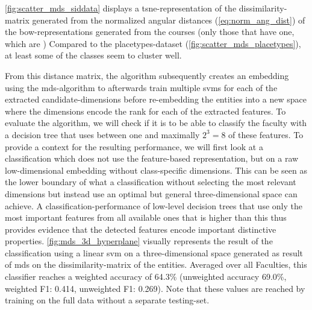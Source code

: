 \autoref{fig:scatter_mds_siddata} displays a \gls{tsne}-representation of the dissimilarity-matrix generated from the normalized angular distances (\autoref{eq:norm_ang_dist}) of the \gls{bow}-representations generated from the courses (only those that have one, which are ) Compared to the placetypes-dataset (\autoref{fig:scatter_mds_placetypes}), at least some of the classes seem to cluster well. 

From this distance matrix, the algorithm subsequently creates an embedding using the \gls{mds}-algorithm to afterwards train multiple \glspl{svm} for each of the extracted candidate-dimensions before re-embedding the entities into a new space where the dimensions encode the \gls{rank} for each of the extracted features. To evaluate the algorithm, we will check if it is to be able to classify the faculty with a decision tree that uses between one and maximally $2^3=8$ of these features. To provide a context for the resulting performance, we will first look at a classification which does not use the feature-based representation, but on a raw low-dimensional embedding without class-specific dimensions. This can be seen as the lower boundary of what a classification without selecting the most relevant dimensions but instead use an optimal but general three-dimensional space can achieve. A classification-performance of low-level decision trees that use only the most important features from all available ones that is higher than this thus provides evidence that the detected features encode important distinctive properties. \autoref{fig:mds_3d_hyperplane} visually represents the result of the classification using a linear \gls{svm} on a three-dimensional space generated as result of \gls{mds} on the dissimilarity-matrix of the entities. Averaged over all Faculties, this classifier reaches a weighted accuracy of 64.3\% (unweighted accuracy 69.0\%, weighted F1: 0.414, unweighted F1: 0.269). Note that these values are reached by training on the full data without a separate testing-set.


